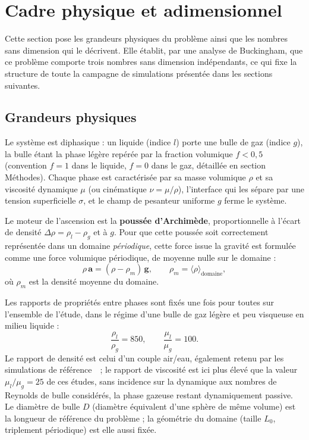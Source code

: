 \section{Cadre physique et adimensionnel}
\label{sec:cadre}

Cette section pose les grandeurs physiques du problème ainsi que les nombres sans dimension qui le décrivent. Elle
établit, par une analyse de Buckingham, que ce problème comporte
trois nombres sans dimension indépendants, ce qui fixe la
structure de toute la campagne de simulations présentée dans les sections
suivantes.

\subsection{Grandeurs physiques}
\label{sec:cadre:grandeurs}

Le système est diphasique : un liquide (indice $l$) porte une bulle de gaz
(indice $g$), la bulle étant la phase légère repérée par la fraction
volumique $f<0{,}5$ (convention $f=1$ dans le liquide, $f=0$ dans le gaz,
détaillée en section Méthodes). Chaque phase est caractérisée par sa masse
volumique $\rho$ et sa viscosité dynamique $\mu$ (ou cinématique
$\nu=\mu/\rho$), l'interface qui les sépare par une tension superficielle
$\sigma$, et le champ de pesanteur uniforme $g$ ferme le système.

Le moteur de l'ascension est la \textbf{poussée d'Archimède}, proportionnelle
à l'écart de densité $\Delta\rho = \rho_l - \rho_g$ et à $g$. Pour que cette
poussée soit correctement représentée dans un domaine \emph{périodique}, cette force issue la gravité est formulée comme une force volumique périodique, de moyenne nulle sur le
domaine :
\begin{equation}
    \rho\,\mathbf{a} = (\rho - \rho_m)\,\mathbf{g},
    \qquad \rho_m = \langle \rho \rangle_{\text{domaine}},
    \label{eq:archimede}
\end{equation}
où $\rho_m$ est la densité moyenne du domaine.

Les rapports de propriétés entre phases sont fixés une fois pour toutes sur
l'ensemble de l'étude, dans le régime d'une bulle de gaz légère et peu visqueuse en
milieu liquide :
\begin{equation}
    \frac{\rho_l}{\rho_g} = 850, \qquad \frac{\mu_l}{\mu_g} = 100.
    \label{eq:rapports}
\end{equation}
Le rapport de densité est celui d'un couple air/eau, également retenu par les simulations de
référence~\cite{riviere2021,liu2024}~; le rapport de viscosité est ici plus élevé que
la valeur $\mu_l/\mu_g=25$ de ces études, sans incidence sur la dynamique aux nombres
de Reynolds de bulle considérés, la phase gazeuse restant dynamiquement passive.
Le diamètre de bulle
$D$ (diamètre équivalent d'une sphère de même volume) est la longueur de
référence du problème ; la géométrie du domaine (taille $L_0$, triplement
périodique) est elle aussi fixée.


